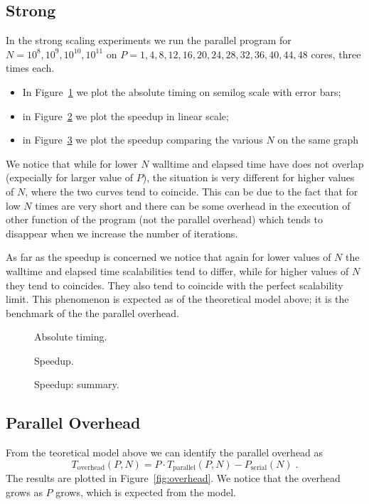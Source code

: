 \documentclass[11pt,a4paper]{article}
\numberwithin{equation}{section}
\begin{document}
\subsection{Strong}
In the strong scaling experiments we run the parallel program for $N = 10^8, 10^9, 10^{10}, 10^{11}$ on $P = 1, 4, 8, 12, 16, 20, 24, 28, 32, 36, 40, 44, 48$ cores, three times each. 
\begin{itemize}
    \item In Figure~\ref{fig:strong_a} we plot the absolute timing on semilog scale with error bars;
    \item in Figure~\ref{fig:strong_s} we plot the speedup in linear scale;
    \item in Figure~\ref{fig:strong_sum} we plot the speedup comparing the various $N$ on the same graph
\end{itemize}
 We notice that while for lower $N$ walltime and elapsed time have does not overlap (expecially for larger value of $P$), the situation is very different for higher values of $N$, where the two curves tend to coincide. This can be due to the fact that for low $N$ times are very short and there can be some overhead in the execution of other function of the program (not the parallel overhead) which tends to disappear when we increase the number of iterations.

 As far as the speedup is concerned we notice that again for lower values of $N$ the walltime and elapsed time scalabilities tend to differ, while for higher values of $N$ they tend to coincides. They also tend to coincide with the perfect scalability limit. This phenomenon is expected as of the theoretical model above; it is the benchmark of the the parallel overhead.

\begin{figure}[htbp]
    \centering
    
    \caption{Absolute timing.}
    \label{fig:strong_a}
\end{figure}
\begin{figure}[htbp]
    \centering
    
    \caption{Speedup.}
    \label{fig:strong_s}
\end{figure}
\begin{figure}[htbp]
    \centering
    
    \caption{Speedup: summary.}
    \label{fig:strong_sum}
\end{figure}

\subsection{Parallel Overhead}\label{subsec:overhead}
From the teoretical model above we can identify the parallel overhead as
\begin{equation}
    T_{\text{overhead}}(P,N) = P \cdot T_{\text{parallel}}(P, N) - P_{\text{serial}}(N)\;.
\end{equation}
The results are plotted in Figure~\ref{fig:overhead}. We notice that the overhead grows as $P$ grows, which is expected from the model.
\end{document}
